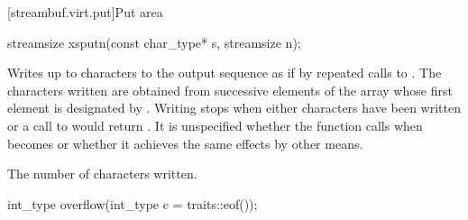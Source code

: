 [streambuf.virt.put]{Put area}

%
\begin{itemdecl}
streamsize xsputn(const char_type* s, streamsize n);
\end{itemdecl}

\begin{itemdescr}
\pnum
\effects
Writes up to  characters to the output sequence as if
by repeated calls to
.
The characters written are obtained from successive elements of
the array whose first element is designated by .
Writing stops when either  characters have been written or
a call to
would return
.
It is unspecified whether the function calls  when  becomes  or whether it achieves the same effects by other means.

\pnum
\returns
The number of characters written.
\end{itemdescr}

%
\begin{itemdecl}
int_type overflow(int_type c = traits::eof());
\end{itemdecl}

